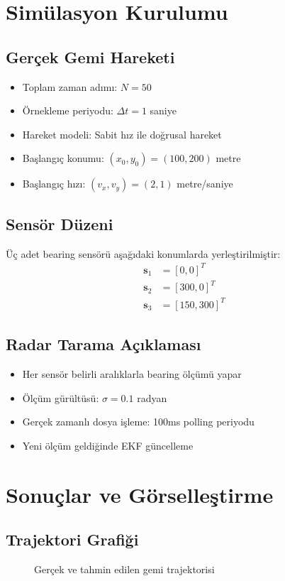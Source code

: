 \documentclass[12pt,a4paper]{article}
\begin{document}
\section{Simülasyon Kurulumu}

\subsection{Gerçek Gemi Hareketi}
\begin{itemize}
    \item Toplam zaman adımı: $N = 50$
    \item Örnekleme periyodu: $\Delta t = 1$ saniye
    \item Hareket modeli: Sabit hız ile doğrusal hareket
    \item Başlangıç konumu: $(x_0, y_0) = (100, 200)$ metre
    \item Başlangıç hızı: $(v_x, v_y) = (2, 1)$ metre/saniye
\end{itemize}

\subsection{Sensör Düzeni}
Üç adet bearing sensörü aşağıdaki konumlarda yerleştirilmiştir:
\begin{align}
\mathbf{s}_1 &= [0, 0]^T \\
\mathbf{s}_2 &= [300, 0]^T \\
\mathbf{s}_3 &= [150, 300]^T
\end{align}

\subsection{Radar Tarama Açıklaması}
\begin{itemize}
    \item Her sensör belirli aralıklarla bearing ölçümü yapar
    \item Ölçüm gürültüsü: $\sigma = 0.1$ radyan
    \item Gerçek zamanlı dosya işleme: 100ms polling periyodu
    \item Yeni ölçüm geldiğinde EKF güncelleme
\end{itemize}

\section{Sonuçlar ve Görselleştirme}

\subsection{Trajektori Grafiği}
\begin{figure}[H]
    \centering
    \caption{Gerçek ve tahmin edilen gemi trajektorisi}
    \label{fig:trajectory}
\end{figure}
\end{document}
